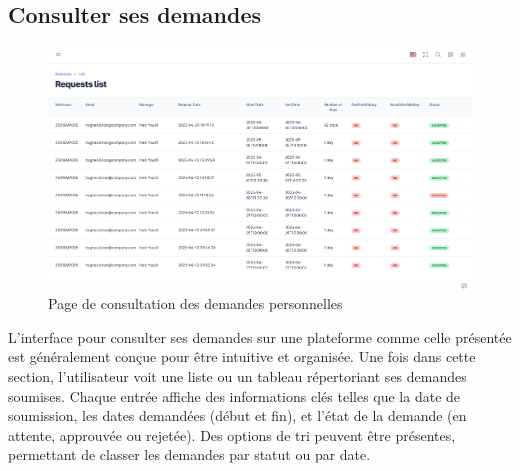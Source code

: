 \subsection{Consulter ses demandes}
\begin{figure}[h]
\vspace{-0.6cm}
    \centering
    \includegraphics[width=15cm]{images/realisation/mesDemandes.png}
    \caption{Page de consultation des demandes personnelles}
    \label{fig:Cmesd}
\end{figure}
\newpage

L'interface pour consulter ses demandes sur une plateforme comme celle présentée est généralement conçue pour être intuitive et organisée. Une fois dans cette section, l'utilisateur voit une liste ou un tableau répertoriant ses demandes soumises. Chaque entrée affiche des informations clés telles que la date de soumission, les dates demandées (début et fin), et l'état de la demande (en attente, approuvée ou rejetée). Des options de tri peuvent être présentes, permettant de classer les demandes par statut ou par date.

